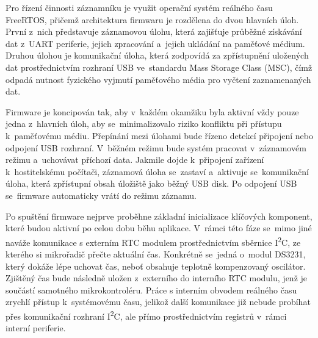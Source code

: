 Pro řízení činnosti záznamníku je využit operační systém reálného času FreeRTOS, přičemž architektura firmwaru je rozdělena do dvou hlavních úloh. První z~nich představuje záznamovou úlohu, která zajišťuje průběžné získávání dat z~UART periferie, jejich zpracování a~jejich ukládání na paměťové médium. Druhou úlohou je komunikační úloha, která zodpovídá za zpřístupnění uložených dat prostřednictvím rozhraní USB ve~standardu Mass Storage Class (MSC), čímž odpadá nutnost fyzického vyjmutí paměťového média pro vyčtení zaznamenaných dat. 



Firmware je koncipován tak, aby v~každém okamžiku byla aktivní vždy pouze jedna z~hlavních úloh, aby se~minimalizovalo riziko konfliktu při přístupu k~paměťovému médiu. Přepínání mezi úlohami bude řízeno detekcí připojení nebo odpojení USB rozhraní. V~běžném režimu bude systém pracovat v~záznamovém režimu a~uchovávat příchozí data. Jakmile dojde k~připojení zařízení k~hostitelskému počítači, záznamová úloha se~zastaví a~aktivuje se~komunikační úloha, která zpřístupní obsah úložiště jako běžný USB disk. Po odpojení USB se~firmware automaticky vrátí do režimu záznamu.

Po spuštění firmware nejprve proběhne základní inicializace klíčových komponent, které budou aktivní po celou dobu běhu aplikace. V~rámci této fáze se~mimo jiné naváže komunikace s externím RTC modulem prostřednictvím sběrnice I\textsuperscript{2}C, ze kterého si mikrořadič přečte aktuální čas. Konkrétně se~jedná o~modul DS3231, který dokáže lépe uchovat čas, neboť obsahuje teplotně kompenzovaný oscilátor. Zjištěný čas bude následně uložen z~externího do interního RTC modulu, jenž je součástí samotného mikrokontroléru. Práce s interním obvodem reálného času zrychlí přístup k~systémovému času, jelikož další komunikace již nebude probíhat přes komunikační rozhraní I\textsuperscript{2}C, ale přímo prostřednictvím registrů v~rámci interní periferie.

